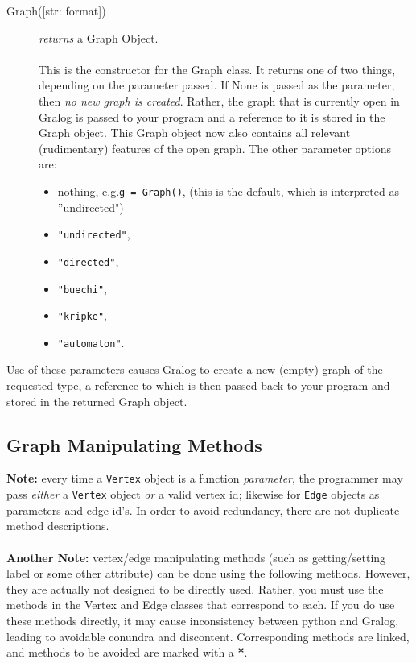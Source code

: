 \documentclass{article}
\newlength\q
\begin{document}
\begin{description}
\item[Graph({[str: format]})] \emph{returns} a Graph Object.\\\\
This is the constructor for the Graph class. It returns one of two things, depending on the parameter passed. If None is passed as the parameter, then \textit{no new graph is created}. Rather, the graph that is currently open in Gralog is passed to your program and a reference to it is stored in the Graph object. This Graph object now also contains all relevant (rudimentary) features of the open graph. The other parameter options are:
\begin{itemize}
\item nothing, e.g.\@ \texttt{g = Graph()}, (this is the default, which is interpreted as ''undirected")
\item \texttt{"{}undirected"},
\item \texttt{"directed"},
\item \texttt{"buechi"},
\item \texttt{"kripke"},
\item \texttt{"{}automaton"}.
\end{itemize}
\end{description}

Use of these parameters causes Gralog to create a new (empty) graph of the requested type, a reference to which is then passed back to your program and stored in the returned Graph object.
\subsection{Graph Manipulating Methods}
\textbf{Note:} every time a \texttt{Vertex} object is a function \textit{parameter}, the programmer may pass \textit{either} a \texttt{Vertex} object \textit{or} a valid vertex id; likewise for \texttt{Edge} objects as parameters and edge id's. In order to avoid redundancy, there are not duplicate method descriptions.\\\\
\textbf{Another Note:} vertex/edge manipulating methods (such as getting/setting label or some other attribute) can be done using the following methods. However, they are actually not designed to be directly used. Rather, you must use the methods in the Vertex and Edge classes that correspond to each. If you do use these methods directly, it may cause inconsistency between python and Gralog, leading to avoidable conundra and discontent. Corresponding methods are linked, and methods to be avoided are marked with a \textbf{*}.
\end{document}

